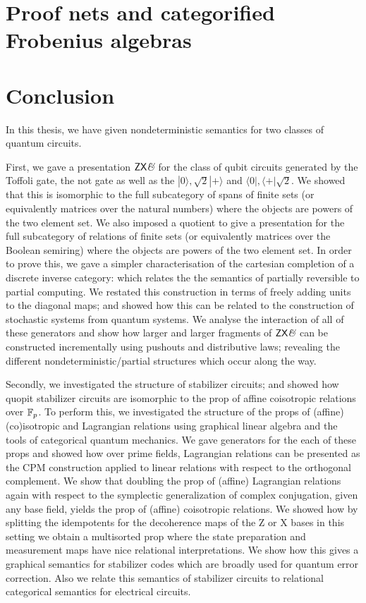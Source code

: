 \documentclass[12pt]{ociamthesis}  %
\begin{document}
\chapter{Proof nets and categorified Frobenius algebras}
\label{chap:grothendieck}


\chapter{Conclusion}
\label{chap:conclusion}


In this thesis, we have given nondeterministic semantics for two classes of quantum circuits.  


First, we gave a presentation $\mathsf{ZX}\textit{\&}$ for the  class of qubit circuits generated by the Toffoli gate, the not gate as well as the $|0\rangle, \sqrt 2 |+\rangle$ and $\langle 0 |, \langle +|\sqrt{2}$.  We showed that this is isomorphic to the full subcategory of spans of finite sets (or equivalently matrices over the natural numbers) where the objects are powers of the two element set.  We also imposed a quotient to give a presentation for the full subcategory of relations of finite sets (or equivalently matrices over the Boolean semiring) where the objects are powers of the two element set.  In order to prove this, we gave a simpler characterisation of the cartesian completion of a discrete inverse category: which relates the the semantics of partially reversible to partial computing.  We restated this construction in terms of freely adding units to the diagonal maps; and showed how this can be related to the construction of stochastic systems from quantum systems.  We analyse the interaction of all of these generators and show how larger and larger fragments of $\mathsf{ZX}\textit{\&}$ can be constructed incrementally using pushouts and distributive laws; revealing the different nondeterministic/partial structures which occur along the way.


Secondly, we investigated the structure of stabilizer circuits; and showed how quopit stabilizer circuits are isomorphic to the prop of affine coisotropic relations over $\mathbb{F}_p$.  To perform this, we investigated the structure of the props of (affine) (co)isotropic and Lagrangian relations using graphical linear algebra and the tools of categorical quantum mechanics.  We gave generators for the each of these props and showed how over prime fields, Lagrangian relations can be presented as the CPM construction applied to linear relations with respect to the orthogonal complement.  We show that doubling the prop of (affine) Lagrangian relations again with respect to the symplectic generalization of complex conjugation, given any base field, yields the prop of (affine) coisotropic relations.  We showed how by splitting the idempotents for the decoherence maps of the Z or X bases in this setting we obtain a multisorted prop where the state preparation and measurement maps have nice relational interpretations.  We show how this gives a graphical semantics for stabilizer codes which are broadly used for quantum error correction.  Also we relate this semantics of stabilizer circuits to relational categorical semantics for electrical circuits.
\end{document}
